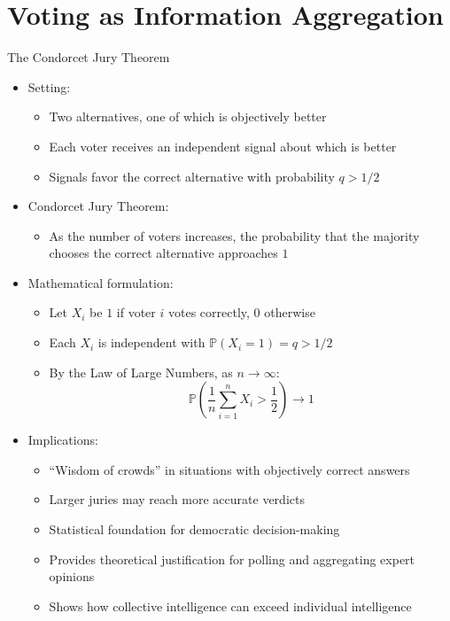 \documentclass[10pt]{beamer}
\begin{document}
\section{Voting as Information Aggregation}

\begin{frame}{The Condorcet Jury Theorem}
  \begin{itemize}[<+->]
    \item Setting: 
      \begin{itemize}
        \item Two alternatives, one of which is objectively better
        \item Each voter receives an independent signal about which is better
        \item Signals favor the correct alternative with probability $q > 1/2$
      \end{itemize}
    \item Condorcet Jury Theorem:
      \begin{itemize}
        \item As the number of voters increases, the probability that the majority chooses the correct alternative approaches $1$
      \end{itemize}
    \item Mathematical formulation:
      \begin{itemize}
        \item Let $X_i$ be $1$ if voter $i$ votes correctly, $0$ otherwise
        \item Each $X_i$ is independent with $\mathbb{P}(X_i = 1) = q > 1/2$
        \item By the Law of Large Numbers, as $n\to\infty$:
          \[\mathbb{P}\left(\frac{1}{n}\sum_{i=1}^n X_i > \frac{1}{2}\right) \to 1\]
          \vspace{-5mm}
      \end{itemize}
    \item Implications:
      \begin{itemize}
        \item ``Wisdom of crowds'' in situations with objectively correct answers
        \item Larger juries may reach more accurate verdicts
        \item Statistical foundation for democratic decision-making
        \item Provides theoretical justification for polling and aggregating expert opinions
        \item Shows how collective intelligence can exceed individual intelligence
      \end{itemize}
  \end{itemize}
\end{frame}
\end{document}
